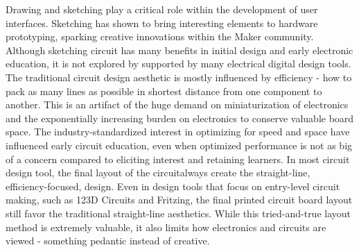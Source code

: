 \documentclass{sigchi}
\begin{document}
Drawing and sketching play a critical role within the development of user interfaces. Sketching has shown to bring interesting elements to hardware prototyping, sparking creative innovations within the Maker community. Although sketching circuit has many benefits in initial design and early electronic education, it is not explored by supported by many electrical digital design tools. The traditional circuit design aesthetic is mostly influenced by efficiency - how to pack as many lines as possible in shortest distance from one component to another. This is an artifact of the huge demand on miniaturization of electronics and the exponentially increasing burden on electronics to conserve valuable board space. The industry-standardized interest in optimizing for speed and space have influenced early circuit education, even when optimized performance is not as big of a concern compared to eliciting interest and retaining learners. In most circuit design tool, the final layout of the circuitalways create the straight-line, efficiency-focused, design. Even in design tools that focus on entry-level circuit making, such as 123D Circuits and Fritzing, the  final printed circuit board layout still favor the traditional straight-line aesthetics. While this tried-and-true layout method is extremely valuable, it also limits how electronics and circuits are viewed - something pedantic instead of creative. 
\end{document}
